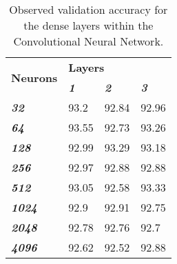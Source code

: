 \documentclass{article}
\begin{document}
\begin{table}[] \footnotesize
\centering
\caption{Observed validation accuracy for the dense layers within the Convolutional Neural Network.}
\label{tab:dense-acc}
\begin{tabular}{@{}llll@{}}
\toprule
\multirow{2}{*}{\textbf{Neurons}} & \multicolumn{3}{l}{\textbf{Layers}}                             \\ \cmidrule(l){2-4} 
                                  & \textit{\textbf{1}} & \textit{\textbf{2}} & \textit{\textbf{3}} \\ \cmidrule(r){1-1}
\textit{\textbf{32}}              & 93.2                & 92.84               & 92.96               \\
\textit{\textbf{64}}              & 93.55               & 92.73               & 93.26               \\
\textit{\textbf{128}}             & 92.99               & 93.29               & 93.18               \\
\textit{\textbf{256}}             & 92.97               & 92.88               & 92.88               \\
\textit{\textbf{512}}             & 93.05               & 92.58               & 93.33               \\
\textit{\textbf{1024}}            & 92.9                & 92.91               & 92.75               \\
\textit{\textbf{2048}}            & 92.78               & 92.76               & 92.7                \\
\textit{\textbf{4096}}            & 92.62               & 92.52               & 92.88               \\ \bottomrule
\end{tabular}
\end{table}
\end{document}
